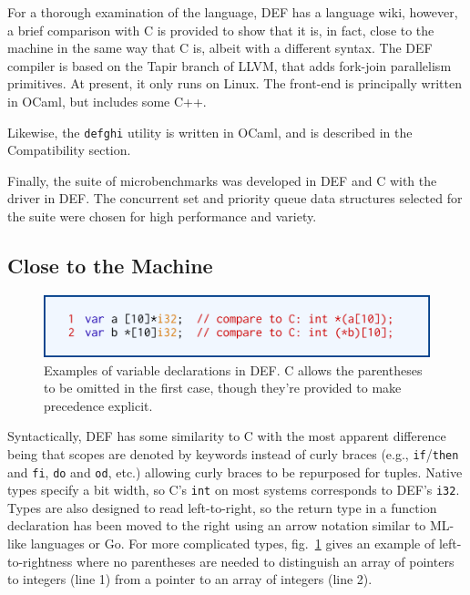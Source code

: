 For a thorough examination of the language, DEF has a language wiki,\cite{DEFWiki} however, a brief comparison with C is provided to show that it is, in fact, close to the machine in the same way that C is, albeit with a different syntax.  The DEF compiler is based on the Tapir branch of LLVM, that adds fork-join parallelism primitives.\cite{TAPIR,LLVM}  At present, it only runs on Linux.  The front-end is principally written in OCaml, but includes some C++.

Likewise, the \texttt{defghi} utility is written in OCaml,\cite{DEF} and is described in the Compatibility section.

Finally, the suite of microbenchmarks was developed in DEF and C with the driver in DEF.  The concurrent set and priority queue data structures selected for the suite were chosen for high performance and variety.

\subsection{Close to the Machine}

\begin{figure}[htbp!]
        \centering
        \includegraphics[scale=0.25]{gfx/types}
        \caption{Examples of variable declarations in DEF.  C allows the parentheses to be omitted in the first case, though they're provided to make precedence explicit.}
        \label{fig:types}
\end{figure}

Syntactically, DEF has some similarity to C with the most apparent difference being that scopes are denoted by keywords instead of curly braces (e.g., \texttt{if}/\texttt{then} and \texttt{fi}, \texttt{do} and \texttt{od}, etc.) allowing curly braces to be repurposed for tuples.  Native types specify a bit width, so C's \texttt{int} on most systems corresponds to DEF's \texttt{i32}.  Types are also designed to read left-to-right, so the return type in a function declaration has been moved to the right using an arrow notation similar to ML-like languages or Go.  For more complicated types, fig.~\ref{fig:types} gives an example of left-to-rightness where no parentheses are needed to distinguish an array of pointers to integers (line 1) from a pointer to an array of integers (line 2).

